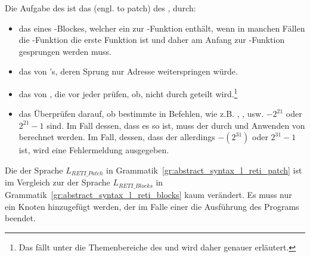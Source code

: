 \label{sec:reti_patch_pass_zweck}

Die Aufgabe des  ist das  (engl. to patch) des , durch:
\begin{itemize}
  \item das  eines -Blockes, welcher ein  zur  -Funktion enthält, wenn in manchen Fällen die -Funktion  die erste Funktion ist und daher am Anfang zur -Funktion gesprungen werden muss.
  \item das  von 's, deren Sprung nur  Adresse weiterspringen würde.
  \item das  von , die vor jeder   prüfen, ob, nicht durch  geteilt wird.\footnote{Das fällt unter die Themenbereiche des  und wird daher  genauer erläutert.}
  \item das Überprüfen darauf, ob bestimmte   in Befehlen, wie z.B. , ,  usw.  $-2^{21}$ oder  $2^{21}-1$ sind. Im Fall dessen, dass es so ist, muss der  durch  und Anwenden von  berechnet werden. Im Fall, dessen, dass der  allerdings  $-(2^{31})$ oder  $2^{31} - 1$ ist, wird eine Fehlermeldung  ausgegeben.
\end{itemize}


Die  der Sprache $L_{RETI\_Patch}$ in Grammatik~\ref{gr:abstract_syntax_l_reti_patch} ist im Vergleich zur  der Sprache $L_{RETI\_Blocks}$ in Grammatik~\ref{gr:abstract_syntax_l_reti_blocks} kaum verändert. Es muss nur ein Knoten  hinzugefügt werden, der im Falle einer   die Ausführung des Programs beendet.

\begin{grammar}
  \toprule
  \retiblocks*
  \midrule
  \picocblocksleftover*
  \bottomrule
\end{grammar}

